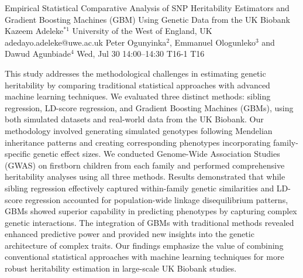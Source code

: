 \documentclass[12pt,lettersize,oneside]{book} %
\begin{document}
\begin{talk}
  {Empirical Statistical Comparative Analysis of SNP Heritability Estimators and Gradient Boosting Machines (GBM) Using Genetic Data from the UK Biobank}%
  {Kazeem Adeleke$^{*1}$}%
  {University of the West of England, UK}%
  {adedayo.adeleke@uwe.ac.uk}%
  {Peter Ogunyinka$^{2}$, Emmanuel Ologunleko$^{3}$ and Dawud Agunbiade$^{4}$}%
  {}%
  {Wed, Jul 30 14:00--14:30}%
  {T16-1}%
  {T16}%
  
    
   
This study addresses the methodological challenges in estimating genetic heritability by comparing traditional statistical approaches with advanced machine learning techniques. We evaluated three distinct methods: sibling regression, LD-score regression, and Gradient Boosting Machines (GBMs), using both simulated datasets and real-world data from the UK Biobank. Our methodology involved generating simulated genotypes following Mendelian inheritance patterns and creating corresponding phenotypes incorporating family-specific genetic effect sizes. We conducted Genome-Wide Association Studies (GWAS) on firstborn children from each family and performed comprehensive heritability analyses using all three methods. Results demonstrated that while sibling regression effectively captured within-family genetic similarities and LD-score regression accounted for population-wide linkage disequilibrium patterns, GBMs showed superior capability in predicting phenotypes by capturing complex genetic interactions. The integration of GBMs with traditional methods revealed enhanced predictive power and provided new insights into the genetic architecture of complex traits. Our findings emphasize the value of combining conventional statistical approaches with machine learning techniques for more robust heritability estimation in large-scale UK Biobank studies.

\medskip


\end{talk}
\end{document}
